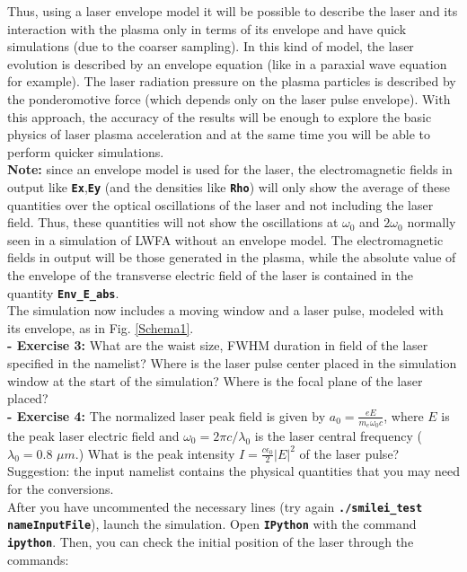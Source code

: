 \documentclass[a4paper,12pt]{extarticle}
\newcommand{\commandline}[1]{\texttt{\textbf{#1}}}
\begin{document}
Thus, using a laser envelope model it will be possible to describe the laser and its interaction with the plasma only in terms of its envelope and have quick simulations (due to the coarser sampling). In this kind of model, the laser evolution is described by an envelope equation (like in a paraxial wave equation for example). The laser radiation pressure on the plasma particles is described by the ponderomotive force (which depends only on the laser pulse envelope). With this approach, the accuracy of the results will be enough to explore the basic physics of laser plasma acceleration and at the same time you will be able to perform quicker simulations. \\

\textbf{ Note:} since an envelope model is used for the laser,  the electromagnetic fields in output like \commandline{Ex},\commandline{Ey} (and the densities like \commandline{Rho}) will only show the average of these quantities over the optical oscillations of the laser and not including the laser field. Thus, these quantities will not show the oscillations at $\omega_0$ and $2\omega_0$ normally seen in a simulation of LWFA without an envelope model. The electromagnetic fields in output will be those generated in the plasma, while the absolute value of the envelope of the transverse electric field of the laser is contained in the quantity \commandline{Env\_E\_abs}. \\

The simulation now includes a moving window and a laser pulse, modeled with its envelope, as in Fig. \ref{Schema1}.\\

\textbf{ - Exercise 3:} What are the waist size, FWHM duration in field of the laser specified in the namelist? Where is the laser pulse center placed in the simulation window at the start of the simulation? Where is the focal plane of the laser placed?\\

\textbf{ - Exercise 4:} The normalized laser peak field is given by $a_0=\frac{eE}{m_e\omega_0 c}$, where $E$ is the peak laser electric field and $\omega_0=2\pi c/\lambda_0$ is the laser central frequency ($\lambda_0=0.8$ $\mu m$.) What is the peak intensity $I=\frac{c\epsilon_0}{2}|E|^2$ of the laser pulse? Suggestion: the input namelist contains the physical quantities that you may need for the conversions.\\

After you have uncommented the necessary lines (try again \commandline{./smilei\_test nameInputFile}), launch the simulation. Open \commandline{IPython} with the command \commandline{ipython}. Then, you can check the initial position of the laser through the commands:\\
\end{document}
